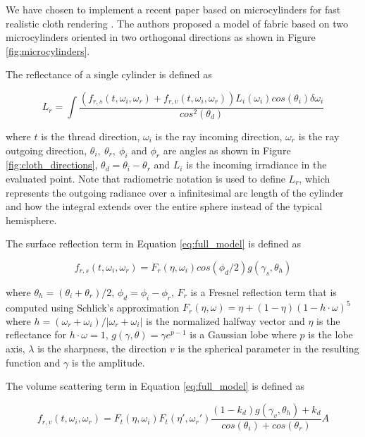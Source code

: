 \documentclass[12pt]{article}
\begin{document}
We have chosen to implement a recent paper based on microcylinders for fast realistic cloth rendering \cite{Sadeghi2013}.
The authors proposed a model of fabric based on two microcylinders oriented in two orthogonal directions as shown in Figure \ref{fig:microcylinders}.

The reflectance of a single cylinder is defined as

\begin{equation}
L_r = \int \frac{\left(f_{r,s}(t, \omega_i, \omega_r) + f_{r,v}(t,\omega_i,\omega_r)\right)L_i(\omega_i)cos(\theta_i)\delta \omega_i}{cos^2(\theta_d)}
\label{eq:full_model}
\end{equation}

where $t$ is the thread direction, $\omega_i$ is the ray incoming direction, $\omega_r$ is the ray outgoing direction, $\theta_i, ~\theta_r, ~ \phi_i \mbox{ and } \phi_r$ are angles as shown in Figure \ref{fig:cloth_directions},  $\theta_d = \theta_i-\theta_r$ and $L_i$ is the incoming irradiance in the evaluated point.
Note that radiometric notation\cite{Marschner2003} is used to define $L_r$, which represents the outgoing radiance over a infinitesimal arc length of the cylinder and how the integral extends over the entire sphere instead of the typical hemisphere.

The surface reflection term in Equation \ref{eq:full_model} is defined as

\begin{equation}
f_{r,s}(t, \omega_i, \omega_r) = F_r(\eta, \omega_i) cos(\phi_d/2)g(\gamma_s, \theta_h)
\end{equation}

where $\theta_h = (\theta_i+\theta_r)/2$, $\phi_d = \phi_i-\phi_r$, $F_r$ is a Fresnel reflection term that is computed using Schlick's\cite{Schlick1994} approximation $F_r(\eta, \omega) = \eta + (1 - \eta)(1 - h \cdot \omega)^5$ where $h = (\omega_r + \omega_i)/ \left|\omega_r + \omega_i \right|$ is the normalized halfway vector and $\eta$ is the reflectance for $h \cdot \omega = 1$, $g(\gamma, \theta) = \gamma e ^{p-1}$ is a Gaussian lobe\cite{Wang2008} where $p$ is the lobe axis, $\lambda$ is the sharpness, the direction $v$ is the spherical parameter in the resulting function and $\gamma$ is the amplitude.

The volume scattering term in Equation \ref{eq:full_model} is defined as

\begin{equation}
f_{r,v}(t,\omega_i,\omega_r) = F_t(\eta, \omega_i) F_t(\eta', \omega_r') \frac{(1-k_d)g(\gamma_v, \theta_h)+k_d}{cos(\theta_i) + cos(\theta_r)} A
\end{equation}
\end{document}
